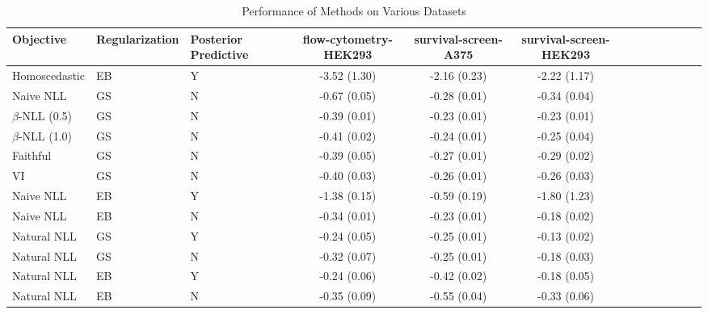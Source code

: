 \begin{table}
\centering
\caption{Performance of Methods on Various Datasets}
\label{tab:results}
\begin{tabular}{|l|l|l|c|c|c|c|c|c|c|c|c|c|}
\toprule
        Objective & Regularization & Posterior Predictive & flow-cytometry-HEK293 & survival-screen-A375 & survival-screen-HEK293 \\
\midrule
    Homoscedastic &             EB &                    Y &          -3.52 (1.30) &         -2.16 (0.23) &           -2.22 (1.17) \\
        Naive NLL &             GS &                    N &          -0.67 (0.05) &         -0.28 (0.01) &           -0.34 (0.04) \\
$\beta$-NLL (0.5) &             GS &                    N &          -0.39 (0.01) &         -0.23 (0.01) &           -0.23 (0.01) \\
$\beta$-NLL (1.0) &             GS &                    N &          -0.41 (0.02) &         -0.24 (0.01) &           -0.25 (0.04) \\
         Faithful &             GS &                    N &          -0.39 (0.05) &         -0.27 (0.01) &           -0.29 (0.02) \\
               VI &             GS &                    N &          -0.40 (0.03) &         -0.26 (0.01) &           -0.26 (0.03) \\
        Naive NLL &             EB &                    Y &          -1.38 (0.15) &         -0.59 (0.19) &           -1.80 (1.23) \\
        Naive NLL &             EB &                    N &          -0.34 (0.01) &         -0.23 (0.01) &           -0.18 (0.02) \\
      Natural NLL &             GS &                    Y &          -0.24 (0.05) &         -0.25 (0.01) &           -0.13 (0.02) \\
      Natural NLL &             GS &                    N &          -0.32 (0.07) &         -0.25 (0.01) &           -0.18 (0.03) \\
      Natural NLL &             EB &                    Y &          -0.24 (0.06) &         -0.42 (0.02) &           -0.18 (0.05) \\
      Natural NLL &             EB &                    N &          -0.35 (0.09) &         -0.55 (0.04) &           -0.33 (0.06) \\
\bottomrule
\end{tabular}
\end{table}
